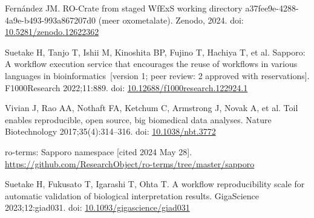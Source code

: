 \documentclass[10pt,letterpaper]{article}
\begin{document}
\begin{thebibliography}{10}
\begin{small}
Fernández JM.
RO-Crate from staged WfExS working directory a37fee9e-4288-4a9e-b493-993a867207d0 (meer oxometalate).
Zenodo, 2024.
doi: \href{https://doi.org/10.5281/zenodo.12622362}{10.5281/zenodo.12622362}


Suetake H, Tanjo T, Ishii M, Kinoshita BP, Fujino T, Hachiya T, et al.
Sapporo: A workflow execution service that encourages the reuse of workflows in various languages in bioinformatics~[version 1; peer review: 2 approved with reservations].
F1000Research 2022;11:889.
doi: \href{https://doi.org/10.12688/f1000research.122924.1}{10.12688/f1000research.122924.1}


Vivian J, Rao AA, Nothaft FA, Ketchum C, Armstrong J, Novak A, et al.
Toil enables reproducible, open source, big biomedical data analyses.
Nature Biotechnology 2017;35(4):314--316.
doi: \href{https://doi.org/10.1038/nbt.3772}{10.1038/nbt.3772}

ro-terms: Sapporo namespace [cited 2024 May 28].
\url{https://github.com/ResearchObject/ro-terms/tree/master/sapporo}

Suetake H, Fukusato T, Igarashi T, Ohta T.
A workflow reproducibility scale for automatic validation of biological interpretation results.
GigaScience 2023;12:giad031.
doi: \href{https://doi.org/10.1093/gigascience/giad031}{10.1093/gigascience/giad031}


\end{small}
\end{thebibliography}
\end{document}
